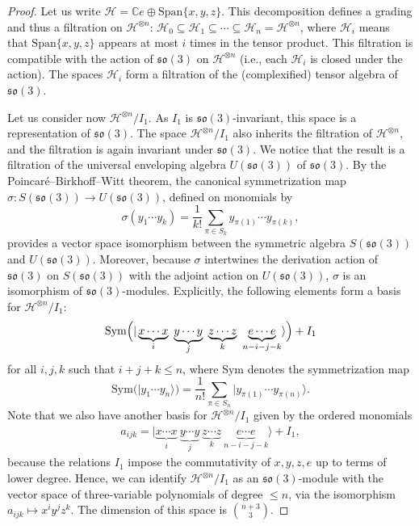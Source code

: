 \documentclass[a4paper]{article}
\newcommand{\ket}[1]{\vert #1 \rangle}
\newcommand{\Span}{\mathrm{Span}}
\newcommand{\so}{\mathfrak{so}}
\theoremstyle{definition}
\begin{document}
\begin{proof}
Let us write $\mathcal{H} = \mathbb{C} e \oplus \Span\{x,y,z\}$. This decomposition defines a grading and thus a filtration on $\mathcal{H}^{\otimes n}$:  $\mathcal{H}_{0} \subseteq \mathcal{H}_1 \subseteq \cdots \subseteq \mathcal{H}_n = \mathcal{H}^{\otimes n}$, where $\mathcal{H}_i$ means that $\Span\{x,y,z\}$ appears at most $i$ times in the tensor product.  This filtration is compatible with the action of $\so(3)$ on $\mathcal{H}^{\otimes n}$ (i.e., each $\mathcal{H}_i$ is closed under the action). The spaces $\mathcal{H}_i$ form a filtration of the (complexified) tensor algebra of $\so(3)$.

Let us consider now $\mathcal{H}^{\otimes n}/I_1$. As $I_1$ is $\so(3)$-invariant, this space is a representation of $\so(3)$. The space $\mathcal{H}^{\otimes n}/I_1$ also inherits the filtration of $\mathcal{H}^{\otimes n}$, and the filtration is again invariant under $\so(3)$.  We notice that the result is a filtration of the universal enveloping algebra $U(\so(3))$ of $\so(3)$. 
By the Poincaré–Birkhoff–Witt theorem, the canonical symmetrization map $\sigma \colon S(\so(3)) \to U(\so(3))$, defined on monomials by
$$\sigma(y_1 \cdots y_k) = \frac{1}{k!} \sum_{\pi \in S_k} y_{\pi(1)} \cdots y_{\pi(k)},$$
provides a vector space isomorphism between the symmetric algebra $S(\so(3))$ and $U(\so(3))$. Moreover, because $\sigma$ intertwines the derivation action of $\so(3)$ on $S(\so(3))$ with the adjoint action on $U(\so(3))$, $\sigma$ is an isomorphism of $\so(3)$-modules. Explicitly, the following elements form a basis for $\mathcal{H}^{\otimes n}/I_1$:
\begin{align*}
    \mathrm{Sym}\Bigl(\ket{\underbrace{x\cdots x}_{i} \ \underbrace{y \cdots y}_j \ \underbrace{z\cdots z}_k \ \underbrace{e\cdots e}_{n-i-j-k}}\Bigr) + I_1 
\end{align*}
for all $i,j,k$ such that $i+j+k\leq n$, where $\mathrm{Sym}$ denotes the symmetrization map
\begin{equation}\label{eq:sym-map}
\mathrm{Sym}\bigl(\ket{y_1 \cdots y_n}\bigr) = \frac{1}{n!} \sum_{\pi \in S_n} \ket{y_{\pi(1)} \cdots y_{\pi(n)}}.
\end{equation}
Note that we also have another basis for $\mathcal{H}^{\otimes n}/I_1$ given by the ordered monomials
\begin{align*}
    a_{ijk} = \ket{\underbrace{x\cdots x}_{i} \ \underbrace{y \cdots y}_j \ \underbrace{z\cdots z}_k \ \underbrace{e\cdots e}_{n-i-j-k}} + I_1,
\end{align*}
because the relations $I_1$ impose the commutativity of $x,y,z,e$ up to terms of lower degree.
Hence, we can identify $\mathcal{H}^{\otimes n}/I_1$ as an $\so(3)$-module with the vector space of three-variable polynomials of degree $\leq n$, via the isomorphism $a_{ijk} \mapsto x^i y^j z^k$. 
The dimension of this space is $\binom{n+3} 3$. 



\end{proof}
\end{document}
